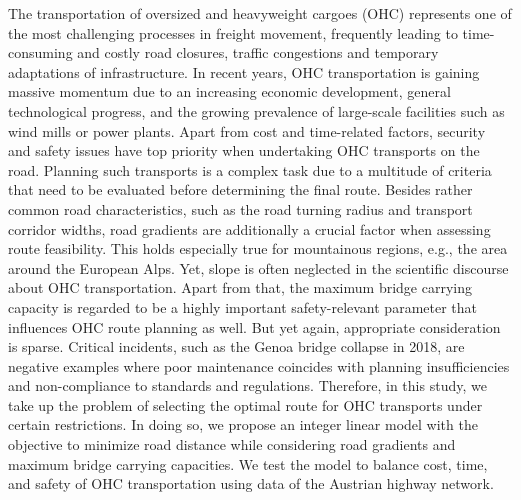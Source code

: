 
The transportation of oversized and heavyweight cargoes (OHC) represents one of the most challenging processes in freight movement, frequently leading to time-consuming and costly road closures, traffic congestions and temporary adaptations of infrastructure. In recent years, OHC transportation is gaining massive momentum due to an increasing economic development, general technological progress, and the growing prevalence of large-scale facilities such as wind mills or power plants. Apart from cost and time-related factors, security and safety issues have top priority when undertaking OHC transports on the road. Planning such transports is a complex task due to a multitude of criteria that need to be evaluated before determining the final route. Besides rather common road characteristics, such as the road turning radius and transport corridor widths, road gradients are additionally  a crucial factor when assessing route feasibility. This holds especially true for mountainous regions, e.g., the area around the European Alps. Yet, slope is often neglected in the scientific discourse about OHC transportation. Apart from that, the maximum bridge carrying capacity is regarded to be a highly important safety-relevant parameter that influences OHC route planning as well. But yet again, appropriate consideration is sparse. Critical incidents, such as the Genoa bridge collapse in 2018, are negative examples where poor maintenance coincides with planning insufficiencies and non-compliance to standards and regulations. Therefore, in this study, we take up the problem of selecting the optimal route for OHC transports under certain restrictions. In doing so, we propose an integer linear model with the objective to minimize road distance while considering road gradients and maximum bridge carrying capacities. We test the model to balance cost, time, and safety of OHC transportation using data of the Austrian highway network.
